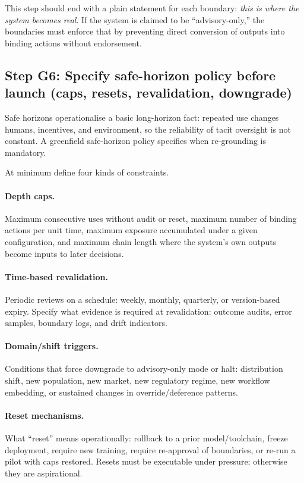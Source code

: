 This step should end with a plain statement for each boundary: \emph{this is where the system becomes real}. If the system is claimed to be ``advisory-only,'' the boundaries must enforce that by preventing direct conversion of outputs into binding actions without endorsement.

\subsection{Step G6: Specify safe-horizon policy before launch (caps, resets, revalidation, downgrade)}

Safe horizons operationalise a basic long-horizon fact: repeated use changes humans, incentives, and environment, so the reliability of tacit oversight is not constant. A greenfield safe-horizon policy specifies when re-grounding is mandatory.

At minimum define four kinds of constraints.

\paragraph{Depth caps.}
Maximum consecutive uses without audit or reset, maximum number of binding actions per unit time, maximum exposure accumulated under a given configuration, and maximum chain length where the system’s own outputs become inputs to later decisions.

\paragraph{Time-based revalidation.}
Periodic reviews on a schedule: weekly, monthly, quarterly, or version-based expiry. Specify what evidence is required at revalidation: outcome audits, error samples, boundary logs, and drift indicators.

\paragraph{Domain/shift triggers.}
Conditions that force downgrade to advisory-only mode or halt: distribution shift, new population, new market, new regulatory regime, new workflow embedding, or sustained changes in override/deference patterns.

\paragraph{Reset mechanisms.}
What ``reset'' means operationally: rollback to a prior model/toolchain, freeze deployment, require new training, require re-approval of boundaries, or re-run a pilot with caps restored. Resets must be executable under pressure; otherwise they are aspirational.

